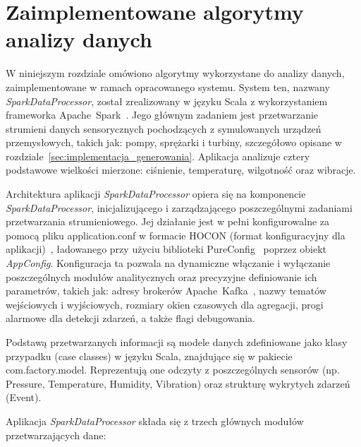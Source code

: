 \section{Zaimplementowane algorytmy analizy danych}
\label{sec:algorytmy_analizy}

W niniejszym rozdziale omówiono algorytmy wykorzystane do analizy danych, zaimplementowane w ramach opracowanego systemu. System ten, nazwany \textit{\mbox{SparkDataProcessor}}, został zrealizowany w języku Scala z wykorzystaniem frameworka \mbox{Apache Spark}~\cite{spark_streaming}. Jego głównym zadaniem jest przetwarzanie strumieni danych sensorycznych pochodzących z symulowanych urządzeń przemysłowych, takich jak: pompy, sprężarki i turbiny, szczegółowo opisane w rozdziale~\ref{sec:implementacja_generowania}. Aplikacja analizuje cztery podstawowe wielkości mierzone: ciśnienie, temperaturę, wilgotność oraz wibracje.

Architektura aplikacji \textit{SparkDataProcessor} opiera się na komponencie \textit{\mbox{SparkDataProcessor}}, inicjalizującego i zarządzającego poszczególnymi zadaniami przetwarzania strumieniowego. Jej działanie jest w pełni konfigurowalne za pomocą pliku application.conf w formacie HOCON (format konfiguracyjny dla aplikacji)~\cite{hocon_spec}, ładowanego przy użyciu biblioteki PureConfig~\cite{pureconfig_docs} poprzez obiekt \textit{AppConfig}. Konfiguracja ta pozwala na dynamiczne włączanie i wyłączanie poszczególnych modułów analitycznych oraz precyzyjne definiowanie ich parametrów, takich jak: adresy brokerów \mbox{Apache Kafka}~\cite{kafka}, nazwy tematów wejściowych i wyjściowych, rozmiary okien czasowych dla agregacji, progi alarmowe dla detekcji zdarzeń, a także flagi debugowania.

Podstawą przetwarzanych informacji są modele danych zdefiniowane jako klasy przypadku (case classes) w języku Scala, znajdujące się w pakiecie com.factory.model. Reprezentują one odczyty z poszczególnych sensorów (np. Pressure, Temperature, Humidity, Vibration) oraz strukturę wykrytych zdarzeń (Event).

Aplikacja \textit{SparkDataProcessor} składa się z trzech głównych modułów przetwarzających dane:

